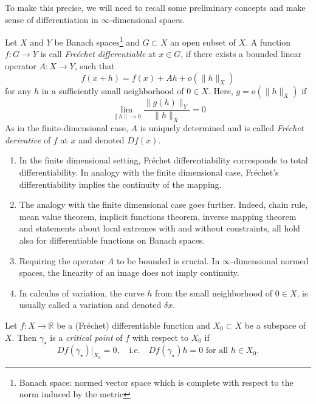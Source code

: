 \documentclass[english,fontsize=11pt,paper=a5,oneside]{scrbook}
\newcommand{\R}{\mathbb{R}}
\theoremstyle{definition}
\newenvironment{remark}
  {\pushQED{\qed}\renewcommand{\qedsymbol}{$\lozenge$}\remarkx}
  {\popQED\endremarkx}
\begin{document}
To make this precise, we will need to recall some preliminary concepts and make sense of differentiation in $\infty$-dimensional spaces.

Let $X$ and $Y$ be Banach spaces\footnote{Banach space: normed vector space which is complete with respect to the norm induced by the metric}  and $G\subset X$ an open subset of $X$.
A function $f: G \to Y$ is call \emph{Fre\'echet differentiable} at $x\in G$, if there exists a bounded linear operator $A: X \to Y$, such that
\begin{equation}\label{eq:frechetdiff}
    f(x+h) = f(x) + Ah + o(\|h\|_X)
\end{equation}
for any $h$ in a sufficiently small neighborhood of $0\in X$.
Here, $g = o(\|h\|_X)$ if
\begin{equation}
    \lim_{\|h\| \to 0} \frac{\|g(h)\|_Y}{\|h\|_X} = 0
\end{equation}
As in the finite-dimensional case, $A$ is uniquely determined and is called \emph{Fr\'echet derivative} of $f$ at $x$ and denoted $D f(x)$.

\begin{remark}
    \begin{enumerate}
        \item In the finite dimensional setting, Fr\'echet differentiability corresponds to total differentiability. In analogy with the finite dimensional case, Fr\'echet's differentiability implies the continuity of the mapping.
        \item The analogy with the finite dimensional case goes further. Indeed, chain rule, mean value theorem, implicit functions theorem, inverse mapping theorem and statements about local extremes with and without constraints, all hold also for differentiable functions on Banach spaces.
        \item Requiring the operator $A$ to be bounded is crucial. In $\infty$-dimensional normed spaces, the linearity of an image does not imply continuity.
        \item In calculus of variation, the curve $h$ from the small neighborhood of $0\in X$, is usually called a variation and denoted $\delta x$.
    \end{enumerate}
\end{remark}

Let $f: X \to \R$ be a (Fr\'echet) differentiable function and $X_0 \subset X$ be a subspace of $X$. Then $\gamma_\star$ is a \emph{critical point} of $f$ with respect to $X_0$ if
\begin{equation}
    Df(\gamma_\star)\Big|_{X_0} = 0, \quad\mbox{i.e.}\quad
    Df(\gamma_\star)h = 0 \mbox{ for all } h\in X_0.
\end{equation}
\end{document}
